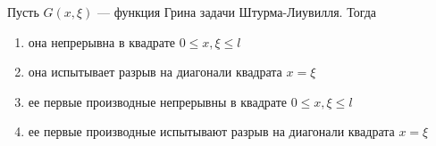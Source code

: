 Пусть \(G\left(x,\xi \right)\) — функция Грина задачи Штурма-Лиувилля. Тогда

\begin{enumerate}[label=\arabic*)]
    \item она непрерывна в квадрате \(0\leq x,\xi \leq l\)
    \item она испытывает разрыв на диагонали квадрата \(x = \xi\)
    \item ее первые производные непрерывны в квадрате \(0 \leq x,\xi \leq l\)
    \item ее первые производные испытывают разрыв на диагонали квадрата \(x = \xi\)
\end{enumerate}

